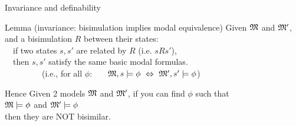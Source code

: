 \documentclass[aspectratio=169]{beamer}
\begin{document}
\begin{slide}{Invariance and definability}\label{s:31}
\small
\begin{block}{Lemma (invariance: bisimulation implies modal equivalence)}
Given  $\mathfrak{M}$ and $\mathfrak{M}'$, and a \alert{bisimulation} 
$R$ between their states:
\\[5mm]
~~\alert{if} two states $s, s'$ are related by $R$ (i.e. $s R s'$),\\
~~\alert{then} $s, s'$  satisfy the same basic modal formulas.\\
~~~~~~~~~\textcolor{black!50}{(i.e., for all $\phi$:
  ~~~$\mathfrak{M},s \models \phi ~\Leftrightarrow~ \mathfrak{M}',s' \models \phi$)}
 \end{block}


\begin{alertblock}{Hence}
  \centering
  Given 2 models $\mathfrak{M}$ and $\mathfrak{M'}$, if you can find $\phi$ such that
  \\[4mm]
  $\mathfrak{M}\models \phi$ and $\mathfrak{M'}\models \phi$
  \\[4mm]
  then they are NOT bisimilar.
  
\end{alertblock}

\end{slide}
\end{document}
